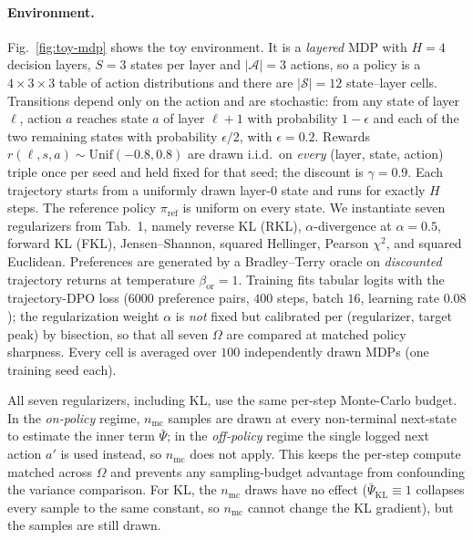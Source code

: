 \paragraph{Environment.}
Fig.~\ref{fig:toy-mdp} shows the toy environment. It is a \emph{layered} MDP with
$H=4$ decision layers, $S=3$ states per layer and $|\mathcal{A}|=3$ actions, so a policy is a
$4\times3\times3$ table of action distributions and there are $|\mathcal{S}|=12$ state--layer
cells. Transitions depend only on the action and are stochastic: from any state of layer
$\ell$, action $a$ reaches state $a$ of layer $\ell+1$ with probability $1-\epsilon$ and each
of the two remaining states with probability $\epsilon/2$, with $\epsilon=0.2$. Rewards
$r(\ell,s,a)\sim\mathrm{Unif}(-0.8,0.8)$ are drawn i.i.d.\ on \emph{every} (layer, state,
action) triple once per seed and held fixed for that seed; the discount is $\gamma=0.9$. Each
trajectory starts from a uniformly drawn layer-$0$ state and runs for exactly $H$ steps. The
reference policy $\pi_{\mathrm{ref}}$ is uniform on every state. We instantiate seven
regularizers from Tab.~1, namely reverse KL (RKL), $\alpha$-divergence at $\alpha=0.5$,
forward KL (FKL), Jensen--Shannon, squared Hellinger, Pearson $\chi^2$, and squared Euclidean.
Preferences are generated by a Bradley--Terry oracle on \emph{discounted} trajectory returns at
temperature $\beta_{\mathrm{or}}=1$. Training fits tabular logits with the trajectory-DPO loss
($6000$ preference pairs, $400$ steps, batch $16$, learning rate $0.08$); the regularization
weight $\alpha$ is \emph{not} fixed but calibrated per (regularizer, target peak) by bisection,
so that all seven $\Omega$ are compared at matched policy sharpness. Every cell is averaged over
$100$ independently drawn MDPs (one training seed each).

All seven regularizers, including KL, use the same per-step Monte-Carlo budget. In the
\emph{on-policy} regime, $n_{\mathrm{mc}}$ samples are drawn at every non-terminal next-state to
estimate the inner term $\bar\Psi$; in the \emph{off-policy} regime the single logged next action
$a'$ is used instead, so $n_{\mathrm{mc}}$ does not apply. This keeps the per-step compute matched
across $\Omega$ and prevents any sampling-budget advantage from confounding the variance
comparison. For KL, the $n_{\mathrm{mc}}$ draws have no effect ($\bar\Psi_{\mathrm{KL}}\equiv1$
collapses every sample to the same constant, so $n_{\mathrm{mc}}$ cannot change the KL gradient),
but the samples are still drawn.


